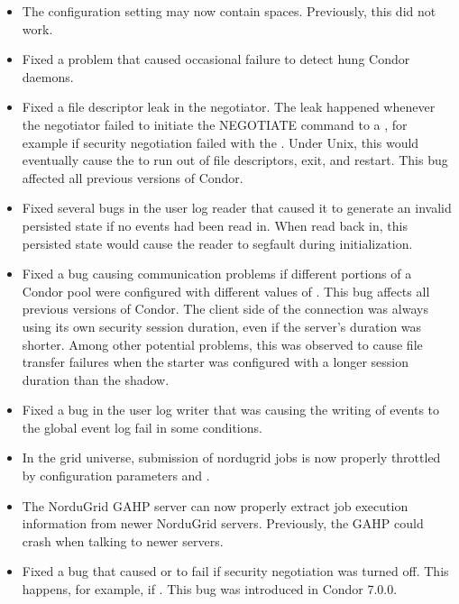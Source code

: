 \begin{itemize}
\item The configuration setting  may now contain spaces.
Previously, this did not work.

\item Fixed a problem that caused occasional failure to detect hung
Condor daemons.

\item Fixed a file descriptor leak in the negotiator.  The leak happened
  whenever the negotiator failed to initiate the NEGOTIATE command to
  a , for example if security negotiation failed
  with the .
  Under Unix, this would eventually cause the  to run out of
  file descriptors, exit, and restart.  This bug affected all previous
  versions of Condor.

\item Fixed several bugs in the user log reader that caused it to
  generate an invalid persisted state if no events had been read in.
  When read back in, this persisted state would cause the reader to
  segfault during initialization.

\item Fixed a bug causing communication problems if different portions
of a Condor pool were configured with different values of
.  This bug affects all
previous versions of Condor.  The client side of the connection was
always using its own security session duration, even if the server's
duration was shorter.  Among other potential problems, this was
observed to cause file transfer failures when the starter was
configured with a longer session duration than the shadow.

\item Fixed a bug in the user log writer that was causing the writing
  of events to the global event log fail in some conditions.

\item In the grid universe, submission of nordugrid jobs is now properly
throttled by configuration parameters
 and
.

\item The NorduGrid GAHP server can now properly extract job execution
information from newer NorduGrid servers. Previously, the GAHP could crash
when talking to newer servers.

\item Fixed a bug that caused   or
   to fail if security negotiation was turned off.
  This happens, for example, if
  .
  This bug was introduced in Condor 7.0.0.


\end{itemize}

